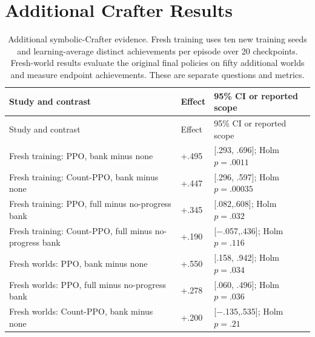 \section{Additional Crafter Results}\label{additional-crafter-results}

\begin{longtable}[]{@{}
  >{\raggedright\arraybackslash}p{}
  >{\raggedleft\arraybackslash}p{}
  >{\raggedright\arraybackslash}p{}@{}}
\caption{Additional symbolic-Crafter evidence. Fresh training uses ten
new training seeds and learning-average distinct achievements per
episode over 20 checkpoints. Fresh-world results evaluate the original
final policies on fifty additional worlds and measure endpoint
achievements. These are separate questions and metrics.}\tabularnewline
\toprule\noalign{}
\begin{minipage}[b]{\linewidth}\raggedright
Study and contrast
\end{minipage} & \begin{minipage}[b]{\linewidth}\raggedleft
Effect
\end{minipage} & \begin{minipage}[b]{\linewidth}\raggedright
95\% CI or reported scope
\end{minipage} \\
\midrule\noalign{}
\endfirsthead
\toprule\noalign{}
\begin{minipage}[b]{\linewidth}\raggedright
Study and contrast
\end{minipage} & \begin{minipage}[b]{\linewidth}\raggedleft
Effect
\end{minipage} & \begin{minipage}[b]{\linewidth}\raggedright
95\% CI or reported scope
\end{minipage} \\
\midrule\noalign{}
\endhead
\bottomrule\noalign{}
\endlastfoot
Fresh training: PPO, bank minus none & +.495 & {[}.293, .696{]}; Holm
\(p=.0011\) \\
Fresh training: Count-PPO, bank minus none & +.447 & {[}.296, .597{]};
Holm \(p=.00035\) \\
Fresh training: PPO, full minus no-progress bank & +.345 &
{[}.082,.608{]}; Holm \(p=.032\) \\
Fresh training: Count-PPO, full minus no-progress bank & +.190 &
{[}\ensuremath{-}.057,.436{]}; Holm \(p=.116\) \\
Fresh worlds: PPO, bank minus none & +.550 & {[}.158, .942{]}; Holm
\(p=.034\) \\
Fresh worlds: PPO, full minus no-progress bank & +.278 & {[}.060,
.496{]}; Holm \(p=.036\) \\
Fresh worlds: Count-PPO, bank minus none & +.200 & {[}\ensuremath{-}.135,.535{]};
Holm \(p=.21\) \\
\end{longtable}

